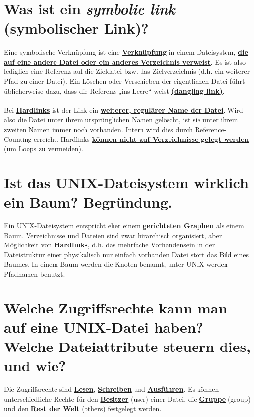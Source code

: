\documentclass[12pt,a4paper,ngerman]{scrartcl}
\newcommand{\crucial}[1]{\textbf{\textcolor{crucial}{\uline{#1}}}}
\newcommand{\question}[1]{#1}
\newenvironment {answer}
                {}
                {}
\begin{document}
\section{\question{Was ist ein \textit{symbolic link} (symbolischer Link)?}}
\begin{answer}
\paragraph*{}
Eine symbolische Verknüpfung ist eine \crucial{Verknüpfung} in einem Dateisystem, \crucial{die auf eine andere Datei oder ein anderes Verzeichnis verweist}. Es ist also lediglich eine Referenz auf die Zieldatei bzw. das Zielverzeichnis (d.h. ein weiterer Pfad zu einer Datei). Ein Löschen oder Verschieben der eigentlichen Datei führt üblicherweise dazu, dass die Referenz „ins Leere“ weist \crucial{(dangling link)}.

\paragraph*{}
Bei \crucial{Hardlinks} ist der Link ein \crucial{weiterer, regulärer Name der Datei}. Wird also die Datei unter ihrem ursprünglichen Namen gelöscht, ist sie unter ihrem zweiten Namen immer noch vorhanden. Intern wird dies durch Reference-Counting erreicht. Hardlinks \crucial{können nicht auf Verzeichnisse gelegt werden} (um Loops zu vermeiden).
\end{answer}



\section{\question{Ist das UNIX-Dateisystem wirklich ein Baum? Begründung.}}
\begin{answer}
Ein UNIX-Dateisystem entspricht eher einem \crucial{gerichteten Graphen} als einem Baum. Verzeichnisse und Dateien sind zwar hirarchisch organisiert, aber Möglichkeit von \crucial{Hardlinks}, d.h. das mehrfache Vorhandensein in der Dateistruktur einer physikalisch nur einfach vorhanden Datei stört das Bild eines Baumes. In einem Baum werden die Knoten benannt, unter UNIX werden Pfadnamen benutzt.
\end{answer}

\section{\question{Welche Zugriffsrechte kann man auf eine UNIX-Datei haben? Welche Dateiattribute steuern dies, und wie?}}
\begin{answer}
Die Zugriffsrechte sind \crucial{Lesen}, \crucial{Schreiben} und \crucial{Ausführen}.
Es können unterschiedliche Rechte für den \crucial{Besitzer} (user) einer Datei, die \crucial{Gruppe} (group) und den \crucial{Rest
der Welt} (others) festgelegt werden.
\end{answer}
\end{document}
